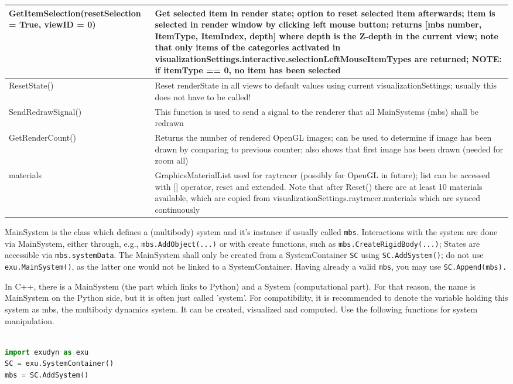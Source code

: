 \begin{center}
\begin{longtable}{| p{8cm} | p{8cm} |}
  GetItemSelection(resetSelection = True, viewID = 0) & Get selected item in render state; option to reset selected item afterwards; item is selected in render window by clicking left mouse button; returns [mbs number, ItemType, ItemIndex, depth] where depth is the Z-depth in the current view; note that only items of the categories activated in visualizationSettings.interactive.selectionLeftMouseItemTypes are returned; NOTE: if itemType == 0, no item has been selected\\ \hline 
  ResetState() & Reset renderState in all views to default values using current visualizationSettings; usually this does not have to be called!\\ \hline 
  SendRedrawSignal() & This function is used to send a signal to the renderer that all MainSystems (mbs) shall be redrawn\\ \hline 
  GetRenderCount() & Returns the number of rendered OpenGL images; can be used to determine if image has been drawn by comparing to previous counter; also shows that first image has been drawn (needed for zoom all)\\ \hline 
  materials & GraphicsMaterialList used for raytracer (possibly for OpenGL in future); list can be accessed with [] operator, reset and extended. Note that after Reset() there are at least 10 materials available, which are copied from visualizationSettings.raytracer.materials which are synced continuously\\ \hline  
\end{longtable}
\end{center}

MainSystem is the class which defines a (multibody) system and it's instance if usually called \texttt{mbs}. Interactions with the system are done via MainSystem, either through, e.g., \texttt{mbs.AddObject(...)} or with create functions, such as \texttt{mbs.CreateRigidBody(...)}; States are accessible via \texttt{mbs.systemData}. The MainSystem shall only be created from a SystemContainer \texttt{SC} using \texttt{SC.AddSystem()}; do not use \texttt{exu.MainSystem()}, as the latter one would not be linked to a SystemContainer. Having already a valid \texttt{mbs}, you may use \texttt{SC.Append(mbs).} 


In C++, there is a MainSystem (the part which links to Python) and a System (computational part). For that reason, the name is MainSystem on the Python side, but it is often just called 'system'. For compatibility, it is recommended to denote the variable holding this system as mbs, the multibody dynamics system. It can be created, visualized and computed. Use the following functions for system manipulation.
\pythonstyle
\begin{lstlisting}[language=Python, firstnumber=1]

import exudyn as exu
SC = exu.SystemContainer()
mbs = SC.AddSystem()
\end{lstlisting}

